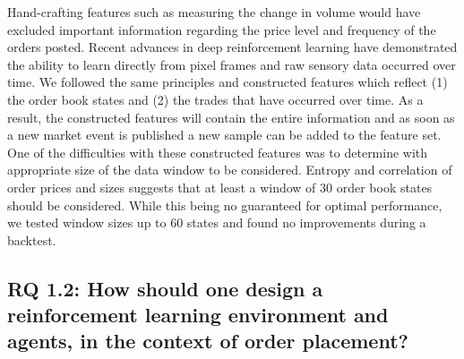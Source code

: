 Hand-crafting features such as measuring the change in volume would have excluded important information regarding the price level and frequency of the orders posted.
Recent advances in deep reinforcement learning have demonstrated the ability to learn directly from pixel frames\cite{mnih2013playing} and raw sensory data\cite{mnih2015human} occurred over time.
We followed the same principles and constructed features which reflect (1) the order book states and (2) the trades that have occurred over time.
As a result, the constructed features will contain the entire information and as soon as a new market event is published a new sample can be added to the feature set.
One of the difficulties with these constructed features was to determine with appropriate size of the data window to be considered.
Entropy and correlation of order prices and sizes suggests that at least a window of 30 order book states should be considered.
While this being no guaranteed for optimal performance, we tested window sizes up to 60 states and found no improvements during a backtest.

\subsection{RQ 1.2: How should one design a reinforcement learning environment and agents, in the context of order placement?}

